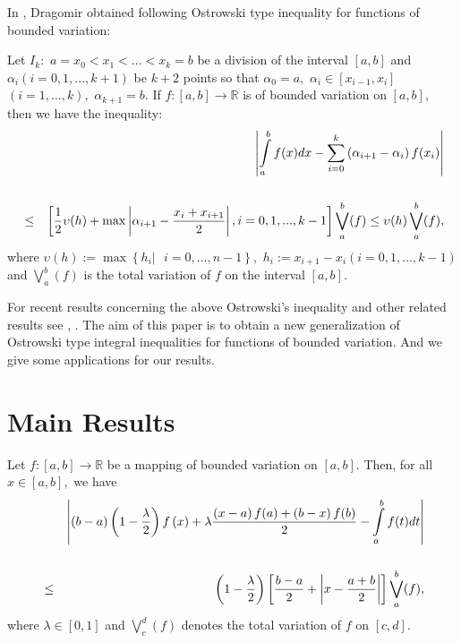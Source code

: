\documentclass[
11pt,%
tightenlines,%
twoside,%
onecolumn,%
nofloats,%
nobibnotes,%
nofootinbib,%
superscriptaddress,%
noshowpacs,%
centertags]%
{revtex4}
\begin{document}
In \cite{dragomir1}, Dragomir obtained following Ostrowski type inequality
for functions of bounded variation:

\begin{theorem}
\label{t0} Let $I_{k}:$ $a=x_{0}<x_{1}<...<x_{k}=b$ be a division of the
interval $\left[ a,b\right] $ and $\alpha _{i}\left( i=0,1,...,k+1\right) $
be $k+2$ points so that $\alpha _{0}=a,$ $\alpha _{i}\in \left[ x_{i-1},x_{i}%
\right] $ $\left( i=1,...,k\right) ,$ $\alpha _{k+1}=b.$ If $f:\left[ a,b%
\right] \rightarrow
\mathbb{R}
$ is of bounded variation on $\left[ a,b\right] ,$ then we have the
inequality:%
\begin{eqnarray}
&&\left\vert \int\limits_{a}^{b}f(x)dx-\sum\limits_{i=0}^{k}\left( \alpha
_{i+1}-\alpha _{i}\right) f(x_{i})\right\vert  \label{E2} \\
&&  \notag \\
&\leq &\left[ \frac{1}{2}\upsilon (h)+\max \left\vert \alpha _{i+1}-\frac{%
x_{i}+x_{i+1}}{2}\right\vert ,i=0,1,...,k-1\right]
\bigvee\limits_{a}^{b}(f) \leq \upsilon
(h)\bigvee\limits_{a}^{b}(f), \notag
\end{eqnarray}%
where $\upsilon (h):=\max \left\{ \left. h_{i}\right\vert \text{ }%
i=0,...,n-1\right\} ,$ $h_{i}:=x_{i+1}-x_{i}\left( i=0,1,...,k-1\right) $
and $\bigvee\limits_{a}^{b}(f)$ is the total variation of $f$ on the
interval $\left[ a,b\right] .$
\end{theorem}

For recent results concerning the above Ostrowski's inequality and
other related results see \cite{alomari}, \cite{tseng4}.
The aim of this paper is to obtain a new generalization of Ostrowski type
integral inequalities for functions of bounded variation. And we give some
applications for our results.

\section{Main Results}

\begin{theorem}
\label{t1} Let $f:\left[ a,b\right] \rightarrow \mathbb{R}$ be a mapping of bounded variation on $\left[ a,b\right] .$ Then, for all $%
x\in \left[ a,b\right] ,$ we have
\begin{eqnarray}\label{e1}
&&\left\vert \left( b-a\right) \left( 1-\frac{\lambda }{2}\right) f\left(
x\right) +\lambda \frac{\left( x-a\right) f(a)+\left( b-x\right) f(b)}{2}%
-\int\limits_{a}^{b}f(t)dt\right\vert  \notag \\
&&  \notag \\
&\leq &\left( 1-\frac{\lambda }{2}\right) \left[ \frac{b-a}{2}+\left\vert x-%
\frac{a+b}{2}\right\vert \right] \bigvee\limits_{a}^{b}(f), \notag
\end{eqnarray}%
where $\lambda \in \left[ 0,1\right] $ and $\bigvee\limits_{c}^{d}(f)$
denotes the total variation of $f$ on $\left[ c,d\right].$
\end{theorem}
\end{document}
